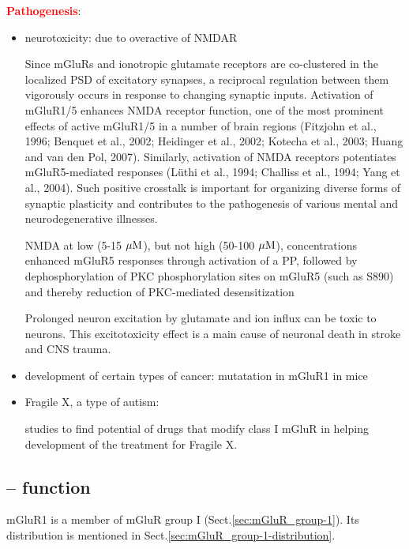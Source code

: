 \textcolor{red}{\bf Pathogenesis}:
\begin{itemize}
  \item neurotoxicity: due to overactive of NMDAR

Since mGluRs and ionotropic glutamate receptors are co-clustered in the localized PSD of
excitatory synapses, a reciprocal regulation between them vigorously occurs in response to
changing synaptic inputs. Activation of mGluR1/5 enhances NMDA receptor function, one of
the most prominent effects of active mGluR1/5 in a number of brain regions (Fitzjohn et al.,
1996; Benquet et al., 2002; Heidinger et al., 2002; Kotecha et al., 2003; Huang and van den
Pol, 2007). Similarly, activation of NMDA receptors potentiates mGluR5-mediated responses
(Lüthi et al., 1994; Challiss et al., 1994; Yang et al., 2004). 
Such positive crosstalk is important
for organizing diverse forms of synaptic plasticity and contributes to the pathogenesis of
various mental and neurodegenerative illnesses. 

NMDA at low (5-15 ${\mu\text{M}}$), but not high (50-100 ${\mu\text{M}}$), concentrations enhanced
mGluR5 responses through activation of a PP, followed by dephosphorylation of
PKC phosphorylation sites on mGluR5 (such as S890) and thereby reduction of
PKC-mediated desensitization


Prolonged neuron excitation by glutamate and ion influx can be toxic to neurons.
This excitotoxicity effect is a main cause of neuronal death in stroke and CNS trauma.
  
  \item development of certain types of cancer: mutatation in mGluR1 in mice
  
  \item Fragile X, a type of autism: 
  
  studies to find potential of drugs that modify class I mGluR in
  helping development of the treatment for Fragile X.
  
\end{itemize}

\subsection{-- function}

mGluR1 is a member of mGluR group I (Sect.\ref{sec:mGluR_group-1}).
Its distribution is mentioned in Sect.\ref{sec:mGluR_group-1-distribution}.

